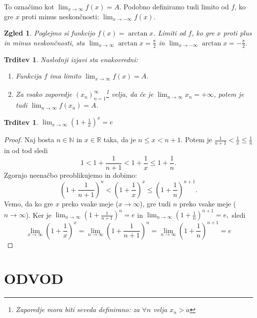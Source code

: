 \documentclass[10pt, a4paper]{article}
\newtheorem{trditev}[izr]{Trditev}
\newtheorem{zgled}{Zgled}[section]
\newenvironment{noticeC}{%
  \tcolorbox[%
  notitle,
  empty,
  enhanced,  %
  breakable,
  coltext=black, 
  fontupper=\rmfamily,
  parbox=false,
  noparskip,
  sharp corners,
  boxrule=-1pt,  %
  frame hidden,
  left=7pt,  %
  right=7pt,
  top=5pt,
  bottom=5pt,
  before skip=2.5ex plus 2pt,
  after skip=2.5ex plus 2pt,
  overlay unbroken and last={%
  },
  ]}
{\endtcolorbox}
\newenvironment{dokaz}%
  {\begin{noticeC}\begin{proof}}%
  {\end{proof}\end{noticeC}}
\newcommand{\N}{\mathbb {N}}
\newcommand{\R}{\mathbb {R}}
\newcommand{\zap}[1]{(#1_n)_{n=1} ^{\infty}}
\newcommand{\limzap}[1]{\lim_{n \to \infty} {#1}}
\newcommand{\limf}[3]{\lim_{#1 \to #2} {#3}}
\begin{document}
To označimo kot $\limf{x}{\infty}{f(x)} = A.$ 
Podobno definiramo tudi limito od $f$, ko gre $x$ proti minus neskončnosti: $\limf{x}{-\infty}{f(x)}.$

\begin{zgled}
    Poglejmo si funkcijo $f(x) = \arctan x$. Limiti od $f$, ko gre $x$ proti plus in minus neskončnosti, sta 
    $\limf{x}{\infty}{\arctan x} = \frac{\pi}{2}$ in $\limf{x}{-\infty}{\arctan x} = -\frac{\pi}{2}.$
\end{zgled}

\begin{trditev}
    Naslednji izjavi sta enakovredni:
    \begin{enumerate}
        \item Funkcija $f$ ima limito $\limf{x}{\infty}{f(x)} = A$.
        \item Za vsako zaporedje $\zap{x}$\footnote{Zaporedje mora biti seveda definirano: za $\forall n$ velja $x_n > a$} velja, da če je
        $\limzap{x_n} = + \infty$, potem je tudi $\limzap{f(x_n)} = A$.
    \end{enumerate}
\end{trditev}

\begin{trditev}
    $\limf{x}{\infty}{\left(1 + \frac{1}{x} \right)^x} = e$
\end{trditev}

\begin{dokaz}
    Naj bosta $n \in \N$ in $x \in \R$ taka, da je $n \leq x < n+1.$ Potem je $\frac{1}{n+1} < \frac{1}{x} \leq \frac{1}{n}$ in od tod sledi $$1 < 1+ \frac{1}{n+1} < 1 + \frac{1}{x} \leq 1 + \frac{1}{n}.$$
    Zgornjo neenačbo preoblikujemo in dobimo: $$\left(1 + \frac{1}{n+1}\right)^n < \left(1 + \frac{1}{x}\right)^x \leq \left(1 + \frac{1}{n} \right)^{n+1}.$$  
    Vemo, da ko gre $x$ preko vsake meje ($x \rightarrow \infty$), gre tudi $n$ preko vsake meje ($n \rightarrow \infty$). Ker je $\limzap{\left(1 + \frac{1}{n+1}\right)^n} = e$ in $\limzap{\left(1 + \frac{1}{n}\right)^{n+1}} = e,$
    sledi $$\limf{x}{\infty}{\left(1 + \frac{1}{x} \right)^x} = \limzap{\left(1 + \frac{1}{n+1}\right)^n} = \limzap{\left(1 + \frac{1}{n}\right)^{n+1}} = e$$
\end{dokaz}

\clearpage
    \section{ODVOD}
\end{document}
